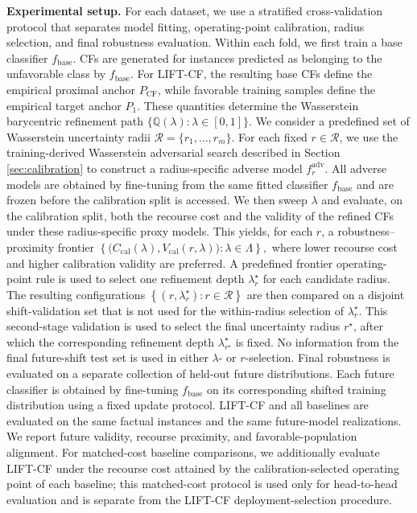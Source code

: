 \textbf{Experimental setup.}
For each dataset, we use a stratified cross-validation protocol that separates model fitting, operating-point calibration, radius selection, and final robustness evaluation. Within each fold, we first train a base classifier $f_{\mathrm{base}}$. CFs are generated for instances predicted as belonging to the unfavorable class by $f_{\mathrm{base}}$. For LIFT-CF, the resulting base CFs define the empirical proximal anchor $P_{\mathrm{CF}}$, while favorable training samples define the empirical target anchor $P_1$. These quantities determine the Wasserstein barycentric refinement path $\{\mathbb{Q}(\lambda):\lambda\in[0,1]\}$. We consider a predefined set of Wasserstein uncertainty radii $\mathcal{R}=\{r_1,\ldots,r_m\}$. For each fixed $r\in\mathcal{R}$, we use the training-derived Wasserstein adversarial search described in Section \ref{sec:calibration} to construct a radius-specific adverse model $f_r^{\mathrm{adv}}$. All adverse models are obtained by fine-tuning from the same fitted classifier $f_{\mathrm{base}}$ and are frozen before the calibration split is accessed. We then sweep $\lambda$ and evaluate, on the calibration split, both the recourse cost and the validity of the refined CFs under these radius-specific proxy models. This yields, for each $r$, a robustness--proximity frontier
$
\left\{
\bigl(
C_{\mathrm{cal}}(\lambda),
V_{\mathrm{cal}}(r,\lambda)
\bigr)
:
\lambda\in\Lambda
\right\},
$
where lower recourse cost and higher calibration validity are preferred. A predefined frontier operating-point rule is used to select one refinement depth $\lambda_r^\star$ for each candidate radius. The resulting configurations
$
\left\{
(r,\lambda_r^\star):r\in\mathcal{R}
\right\}
$
are then compared on a disjoint shift-validation set that is not used for the within-radius selection of $\lambda_r^\star$. This second-stage validation is used to select the final uncertainty radius $r^\star$, after which the corresponding refinement depth $\lambda_{r^\star}^\star$ is fixed. No information from the final future-shift test set is used in either $\lambda$- or $r$-selection. Final robustness is evaluated on a separate collection of held-out future distributions. Each future classifier is obtained by fine-tuning $f_{\mathrm{base}}$ on its corresponding shifted training distribution using a fixed update protocol. LIFT-CF and all baselines are evaluated on the same factual instances and the same future-model realizations. We report future validity, recourse proximity, and favorable-population alignment. For matched-cost baseline comparisons, we additionally evaluate LIFT-CF under the recourse cost attained by the calibration-selected operating point of each baseline; this matched-cost protocol is used only for head-to-head evaluation and is separate from the LIFT-CF deployment-selection procedure.

